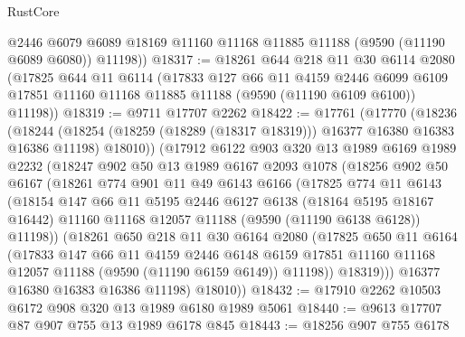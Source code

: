 \begin{lexlean}{RustCore}
\begin{coremodule}
        @2446
        @6079
        @6089
        @18169
        @11160
        @11168
        @11885
        @11188
        (@9590 (@11190 @6089 @6080))
        @11198))
@18317 := @18261
    @644
    @218
    @11
    @30
    @6114
    @2080
    (@17825
      @644
      @11
      @6114
      (@17833
        @127
        @66
        @11
        @4159
        @2446
        @6099
        @6109
        @17851
        @11160
        @11168
        @11885
        @11188
        (@9590 (@11190 @6109 @6100))
        @11198))
@18319 := @9711 @17707 @2262
@18422 := @17761
    (@17770
      (@18236
        (@18244
          (@18254 (@18259 (@18289 (@18317 @18319))) @16377 @16380 @16383 @16386 @11198)
          @18010))
      (@17912
        @6122
        @903
        @320
        @13
        @1989
        @6169
        @1989
        @2232
        (@18247
          @902
          @50
          @13
          @1989
          @6167
          @2093
          @1078
          (@18256
            @902
            @50
            @6167
            (@18261
              @774
              @901
              @11
              @49
              @6143
              @6166
              (@17825
                @774
                @11
                @6143
                (@18154
                  @147
                  @66
                  @11
                  @5195
                  @2446
                  @6127
                  @6138
                  (@18164 @5195 @18167 @16442)
                  @11160
                  @11168
                  @12057
                  @11188
                  (@9590 (@11190 @6138 @6128))
                  @11198))
              (@18261
                @650
                @218
                @11
                @30
                @6164
                @2080
                (@17825
                  @650
                  @11
                  @6164
                  (@17833
                    @147
                    @66
                    @11
                    @4159
                    @2446
                    @6148
                    @6159
                    @17851
                    @11160
                    @11168
                    @12057
                    @11188
                    (@9590 (@11190 @6159 @6149))
                    @11198))
                @18319)))
          @16377
          @16380
          @16383
          @16386
          @11198)
        @18010))
@18432 := @17910 @2262 @10503 @6172 @908 @320 @13 @1989 @6180 @1989 @5061
@18440 := @9613 @17707 @87 @907 @755 @13 @1989 @6178 @845
@18443 := @18256 @907 @755 @6178

\end{coremodule}
\end{lexlean}
